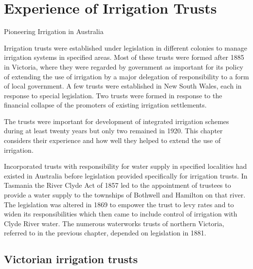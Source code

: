 
\setcounter{endnote}{0}

\chapter{Experience of Irrigation Trusts}
\label{ch:trusts}
%
{Pioneering Irrigation in Australia}

Irrigation trusts were established under legislation in different
colonies to manage irrigation systems in specified areas. Most of
these trusts were formed after 1885 in Victoria, where they were
regarded by government as important for its policy of extending the
use of irrigation by a major delegation of responsibility to a form of
local government.  A few trusts were established in New South Wales,
each in response to special legislation.  Two trusts were formed in
response to the financial collapse of the promoters of existing
irrigation settlements.

The trusts were important for development of integrated irrigation
schemes during at least twenty years but only two remained in 1920.
This chapter considers their experience and how well they helped to
extend the use of irrigation.

Incorporated trusts with responsibility for water supply in specified
localities had existed in Australia before legislation provided
specifically for irrigation trusts.  In Tasmania the River Clyde Act
of 1857 led to the appointment of trustees to provide a water supply
to the townships of Bothwell and Hamilton on that river.  The
legislation was altered in 1869 to empower the trust to levy rates and
to widen its responsibilities which then came to include control of
irrigation with Clyde River  water.  The numerous
waterworks trusts of northern Victoria, referred to in the previous
chapter, depended on legislation in
1881.

\section*{Victorian irrigation trusts}

